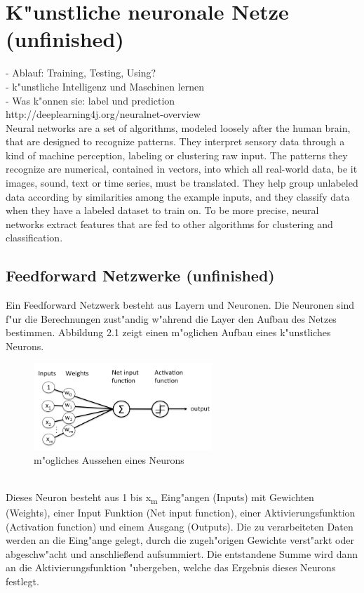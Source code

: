 \chapter{K"unstliche neuronale Netze (unfinished)}
{
- Ablauf: Training, Testing, Using?\\
- k"unstliche Intelligenz und Maschinen lernen\\
- Was k"onnen sie: label und prediction\\
http://deeplearning4j.org/neuralnet-overview\\
Neural networks are a set of algorithms, modeled loosely after the human brain, that are designed to recognize patterns. They interpret sensory data through a kind of machine perception, labeling or clustering raw input. The patterns they recognize are numerical, contained in vectors, into which all real-world data, be it images, sound, text or time series, must be translated.
They help group unlabeled data according by similarities among the example inputs, and they classify data when they have a labeled dataset to train on. To be more precise, neural networks extract features that are fed to other algorithms for clustering and classification.

\section{Feedforward Netzwerke (unfinished)}
Ein Feedforward Netzwerk besteht aus Layern und Neuronen. Die Neuronen sind f"ur die Berechnungen zust"andig w"ahrend die Layer den Aufbau des Netzes bestimmen. Abbildung 2.1 zeigt einen m"oglichen Aufbau eines k"unstliches Neurons.
\renewcommand{\figurename}{Abb.}
\begin{figure}[htp]
\centering
\includegraphics[width=0.60\textwidth]{pictures/perceptron_node.png}
\caption[Ein Neuron]{m"ogliches Aussehen eines Neurons\protect\footnotemark}
\end{figure}
\\
Dieses Neuron besteht aus 1 bis x\textsubscript{m} Eing"angen (Inputs) mit Gewichten (Weights), einer Input Funktion (Net input function), einer Aktivierungsfunktion (Activation function) und einem Ausgang (Outputs). Die zu verarbeiteten Daten werden an die Eing"ange gelegt, durch die zugeh"origen Gewichte verst"arkt oder abgeschw"acht und anschlie{\ss}end aufsummiert. Die entstandene Summe wird dann an die Aktivierungsfunktion "ubergeben, welche das Ergebnis dieses Neurons festlegt.


}
